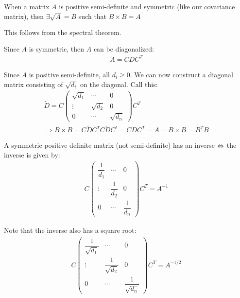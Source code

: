 \par\bigskip
\begin{theo}[]{}
  When a matrix $A$ is positive semi-definite and symmetric (like our covariance matrix), then $\exists \sqrt{A} = B$ such that $B\times B = A$
  \par\bigskip
  \noindent This follows from the spectral theorem. 
\end{theo}
\par\bigskip
\begin{prf}[]{}
  Since $A$ is symmetric, then $A$ can be diagonalized:
  \begin{equation*}
    \begin{gathered}
      A = CDC^T
    \end{gathered}
  \end{equation*}
  \par\bigskip
  \noindent Since $A$ is positive semi-definite, all $d_i\geq0$. We can now construct a diagonal matrix consisting of $\sqrt{d_i}$ on the diagonal. Call this:
  \begin{equation*}
    \begin{gathered}
      \widetilde{D} = C\begin{pmatrix}\sqrt{d_1}&\cdots&0\\\vdots&\sqrt{d_2}&0\\0&\cdots&\sqrt{d_n}\end{pmatrix}C^T\\
      \Rightarrow B\times B = C\widetilde{D}C^TC\widetilde{D}C^t = CDC^T = A= B\times B = B^TB
    \end{gathered}
  \end{equation*}
\end{prf}
\par\bigskip
\noindent A symmetric positive definite matrix (not semi-definite) has an inverse $\Leftrightarrow$ the inverse is given by:
\begin{equation*}
  \begin{gathered}
    C\begin{pmatrix}\dfrac{1}{d_1}&\cdots&0\\\vdots&\dfrac{1}{d_2}&0\\0&\cdots&\dfrac{1}{d_n}\end{pmatrix}C^T = A^{-1}
  \end{gathered}
\end{equation*}
\par\bigskip
\noindent Note that the inverse also has a square root:
\begin{equation*}
  \begin{gathered}
    C\begin{pmatrix}\dfrac{1}{\sqrt{d_1}}&\cdots&0\\\vdots&\dfrac{1}{\sqrt{d_2}}&0\\0&\cdots&\dfrac{1}{\sqrt{d_n}}\end{pmatrix}C^T = A^{-1/2}
  \end{gathered}
\end{equation*}
